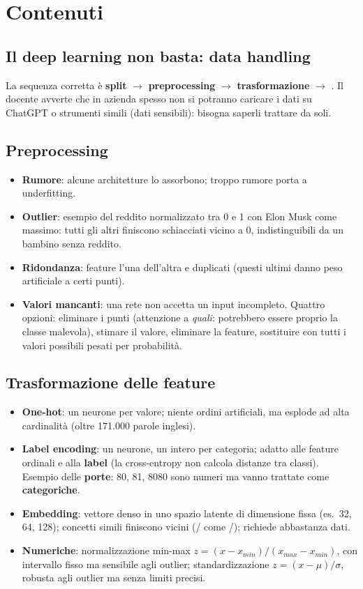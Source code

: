 \section{Contenuti}

\subsection{Il deep learning non basta: data handling}
La sequenza corretta è \textbf{split} $\to$ \textbf{preprocessing} $\to$ \textbf{trasformazione}
$\to$ . Il docente avverte che in azienda spesso non si potranno caricare i
dati su ChatGPT o strumenti simili (dati sensibili): bisogna saperli trattare da soli.

\subsection{Preprocessing}
\begin{itemize}
  \item \textbf{Rumore}: alcune architetture lo assorbono; troppo rumore porta a underfitting.
  \item \textbf{Outlier}: esempio del reddito normalizzato tra 0 e 1 con Elon Musk come massimo: tutti
    gli altri finiscono schiacciati vicino a 0, indistinguibili da un bambino senza reddito.
  \item \textbf{Ridondanza}: feature  l'una dell'altra e duplicati (questi ultimi danno
    peso artificiale a certi punti).
  \item \textbf{Valori mancanti}: una rete non accetta un input incompleto. Quattro opzioni: eliminare
    i punti (attenzione a \emph{quali}: potrebbero essere proprio la classe malevola), stimare il
    valore, eliminare la feature, sostituire con tutti i valori possibili pesati per probabilità.
\end{itemize}

\subsection{Trasformazione delle feature}
\begin{itemize}
  \item \textbf{One-hot}: un neurone per valore; niente ordini artificiali, ma esplode ad alta
    cardinalità (oltre 171.000 parole inglesi).
  \item \textbf{Label encoding}: un neurone, un intero per categoria; adatto alle feature ordinali e
    alla \textbf{label} (la cross-entropy non calcola distanze tra classi). Esempio delle
    \textbf{porte}: 80, 81, 8080 sono numeri ma vanno trattate come \textbf{categoriche}.
  \item \textbf{Embedding}: vettore denso in uno spazio latente di dimensione fissa (es.\ 32, 64,
    128); concetti simili finiscono vicini (/ come /); richiede
    abbastanza dati.
  \item \textbf{Numeriche}: normalizzazione min-max $z=(x-x_{min})/(x_{max}-x_{min})$, con intervallo
    fisso ma sensibile agli outlier; standardizzazione $z=(x-\mu)/\sigma$, robusta agli outlier ma
    senza limiti precisi.
\end{itemize}

